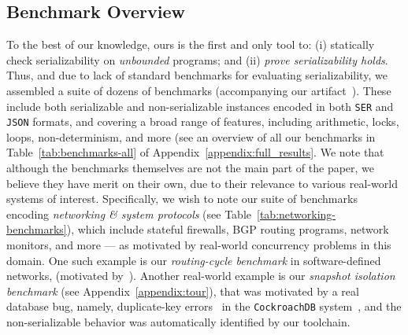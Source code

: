 \subsection{Benchmark Overview} 
\label{subsec:benchmarks}
To the best of our knowledge, ours is the first and only tool to: (i) statically check serializability on \textit{unbounded} programs; and (ii) \textit{prove serializability holds}.
%
Thus, and due to lack of standard benchmarks for evaluating serializability, we 
assembled a suite of dozens of benchmarks (accompanying our artifact~\cite{ArtifactRepository}).
These include both serializable and non-serializable instances encoded in both \texttt{SER} and \texttt{JSON} formats, and covering a broad range of features, including arithmetic, locks, loops, non-determinism, and more (see an overview of all our benchmarks in Table~\ref{tab:benchmarks-all} of Appendix~\ref{appendix:full_results}.
%
We note that although the benchmarks themselves are not the main part of the paper, we believe they have merit on their own, due to their relevance to various real-world systems of interest.
%
Specifically, we wish to note our suite of benchmarks encoding \textit{networking \& system protocols} (see Table~\ref{tab:networking-benchmarks}), which include stateful firewalls, BGP routing programs, network monitors, and more --- 
%
as motivated by real-world concurrency problems in this domain. One such example is our \textit{routing-cycle benchmark} in software-defined networks, (motivated by~\cite{NaGhSa24}). Another real-world example is our \textit{snapshot isolation benchmark} (see Appendix~\ref{appendix:tour}), that was motivated by a real database bug, namely, duplicate-key errors~\cite{cockroach-issue-14099} in the \texttt{CockroachDB} system~\cite{cockroachdb-si-docs}, and the non-serializable behavior was automatically identified by our toolchain.
%




